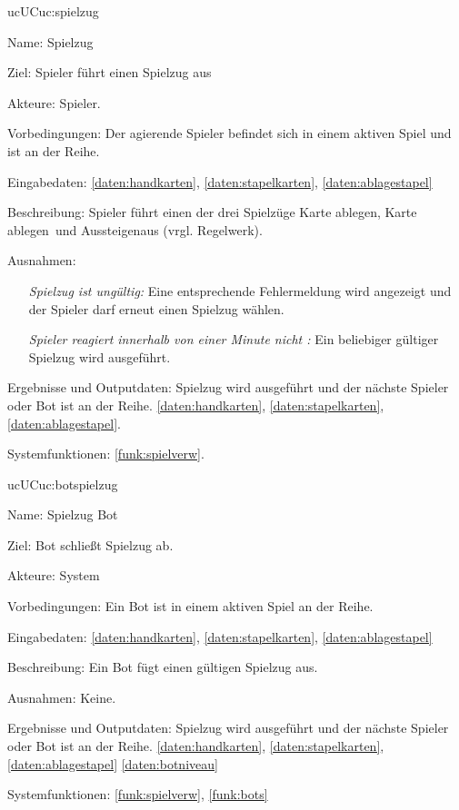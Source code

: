 \begin{description}[leftmargin=5em, style=sameline]
	\begin{lhp}{uc}{UC}{uc:spielzug}
		\item [Name:]Spielzug
		\item [Ziel:]Spieler führt einen Spielzug aus 
		\item [Akteure:]Spieler.
		\item [Vorbedingungen:]Der agierende Spieler befindet sich in einem aktiven Spiel und ist an der Reihe.
		\item [Eingabedaten:] \ref{daten:handkarten}, \ref{daten:stapelkarten}, \ref{daten:ablagestapel} 
		\item [Beschreibung:] Spieler führt einen der drei Spielzüge \dq Karte ablegen\dq, \dq Karte ablegen\dq\ und \dq Aussteigen\dq aus (vrgl. Regelwerk).
		\item [Ausnahmen:] \hfill
		\begin{itemize}
		    \item [] \textit{Spielzug ist ungültig:} Eine entsprechende Fehlermeldung wird angezeigt und der Spieler darf erneut einen Spielzug wählen.
		    
		    \item [] \textit{Spieler reagiert innerhalb von einer Minute nicht :} Ein beliebiger gültiger Spielzug wird ausgeführt.
		\end{itemize}
		\item [Ergebnisse und Outputdaten:] Spielzug wird ausgeführt und der nächste Spieler oder Bot ist an der Reihe. \ref{daten:handkarten}, \ref{daten:stapelkarten}, \ref{daten:ablagestapel}.
		\item [Systemfunktionen:]\ref{funk:spielverw}.
	\end{lhp}
	
	\begin{lhp}{uc}{UC}{uc:botspielzug}
		\item [Name:]Spielzug Bot
		\item [Ziel:]Bot schließt Spielzug ab.
		\item [Akteure:]System 
		\item [Vorbedingungen:]Ein Bot ist in einem aktiven Spiel an der Reihe.
		\item [Eingabedaten:] 
		\ref{daten:handkarten}, \ref{daten:stapelkarten}, \ref{daten:ablagestapel} 
		\item [Beschreibung:] Ein Bot fügt einen gültigen Spielzug aus.
		\item [Ausnahmen:]Keine. 
		\item [Ergebnisse und Outputdaten:]Spielzug wird ausgeführt und der nächste Spieler oder Bot ist an der Reihe. \ref{daten:handkarten}, \ref{daten:stapelkarten}, \ref{daten:ablagestapel} 
		\ref{daten:botniveau}
		\item [Systemfunktionen:] \ref{funk:spielverw}, \ref{funk:bots}
	\end{lhp}
	

\end{description}
